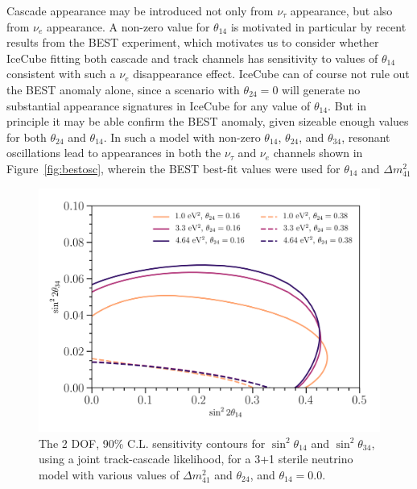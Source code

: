 \documentclass[main.tex]{subfiles}
\begin{document}
Cascade appearance may be introduced not only from $\nu_\tau$ appearance, but also from $\nu_e$ appearance.  A non-zero value for $\theta_{14}$ is motivated in particular by recent results from the BEST experiment, which motivates us to consider whether IceCube fitting both cascade and track channels has sensitivity to values of $\theta_{14}$ consistent with such a $\nu_e$ disappearance effect.  IceCube can of course not rule out the BEST anomaly alone, since a scenario with $\theta_{24}=0$ will generate no substantial appearance signatures in IceCube for any value of $\theta_{14}$.  But in principle it may be able confirm the BEST anomaly, given sizeable enough values for both $\theta_{24}$ and $\theta_{14}$. In such a model with non-zero $\theta_{14}$, $\theta_{24}$, and $\theta_{34}$, resonant oscillations lead to appearances in both the $\nu_{\tau}$ and $\nu_{e}$ channels shown in Figure~\ref{fig:bestosc}, wherein the BEST best-fit values were used for $\theta_{14}$ and $\Delta m_{41}^{2}$ 

\begin{figure}
    \centering
    \includegraphics[width=0.99\linewidth]{figures/bestPlot_asimov.png}
    \caption{The 2 DOF, 90\% C.L. sensitivity contours for $\sin^{2}\theta_{14}$ and $\sin^{2}\theta_{34}$, using a joint track-cascade likelihood, for a 3+1 sterile neutrino model with various values of $\Delta m_{41}^{2}$ and $\theta_{24}$, and $\theta_{14}=0.0$.}\label{fig:bestfirst}
\end{figure}
\end{document}
